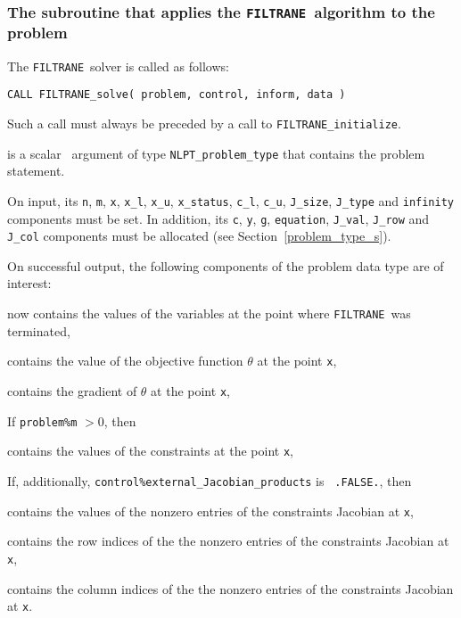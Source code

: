 \documentclass{galahad}
\newcommand{\packagename}{FILTRANE}
\newcommand{\filtrane}{{\tt \packagename}}
\begin{document}

\subsubsection{The subroutine that applies the \filtrane\ algorithm to the
problem}
The \filtrane\ solver is called as follows:
\vspace*{1mm}

\hspace{8mm}
{\tt CALL \packagename\_solve( problem, control, inform, data )}

\noindent
Such a call must always be preceded by a call to {\tt \packagename\_initialize}.

\begin{description}
 is a scalar \intentout\ argument of type
{\tt NLPT\_problem\_type} that contains the problem statement.

\noindent
On input, its
{\tt n}, {\tt m}, {\tt x}, {\tt x\_l}, {\tt x\_u}, {\tt x\_status}, {\tt c\_l},
{\tt c\_u}, {\tt J\_size}, {\tt J\_type} and {\tt infinity} components must be
set. In addition, its {\tt c}, {\tt y}, {\tt g}, {\tt equation}, {\tt J\_val},
{\tt J\_row} and {\tt J\_col} components must be allocated (see
Section~\ref{problem_type_s}).

\noindent
On successful output, the following components of the problem data type are of
interest:
\begin{description}
 now contains the values of the variables at the point where
\filtrane\ was terminated,


 contains the value of the objective function $\theta$ at the point
{\tt x},

 contains the gradient of $\theta$ at the point {\tt x},
\end{description}
If {\tt problem\%m} $>0$, then
\begin{description}
 contains the values of the constraints at the point {\tt x},
\end{description}
If, additionally, {\tt control\%external\_Jacobian\_products} is {\tt
.FALSE.},
then
\begin{description}
 contains the values of the nonzero entries of the constraints
Jacobian at {\tt x},

 contains the row indices of the the nonzero entries of the
constraints Jacobian at {\tt x},

 contains the column indices of the the nonzero entries of the
constraints Jacobian at {\tt x}.
\end{description}


\end{description}
\end{document}
